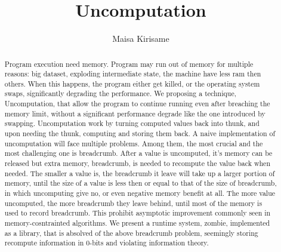 \documentclass[acmsmall]{acmart}
\begin{document}
	
	\title{Uncomputation}
	
	\author{Maisa Kirisame}
	\authornotemark[1]
	
	\renewcommand{\shortauthors}{Trovato et al.}
	
	\begin{abstract}
		Program execution need memory. Program may run out of memory for multiple reasons: big dataset, exploding intermediate state, the machine have less ram then others. When this happens, the program either get killed, or the operating system swaps, significantly degrading the performance.
		We proposing a technique, Uncomputation, that allow the program to continue running even after breaching the memory limit, without a significant performance degrade like the one introduced by swapping.
		Uncomputation work by turning computed values back into thunk, and upon needing the thunk, computing and storing them back.
		A naive implementation of uncomputation will face multiple problems. Among them, the most crucial and the most challenging one is breadcrumb. After a value is uncomputed, it's memory can be released but extra memory, breadcrumb, is needed to recompute the value back when needed.
		The smaller a value is, the breadcrumb it leave will take up a larger portion of memory, until the size of a value is less then or equal to that of the size of breadcrumb, in which uncomputing give no, or even negative memory benefit at all.
		The more value uncomputed, the more breadcrumb they leave behind, until most of the memory is used to record breadcrumb. This prohibit asymptotic improvement commonly seen in memory-cosntrainted algorithms.
		We present a runtime system, zombie, implemented as a library, that is absolved of the above breadcrumb problem, seemingly storing recompute information in 0-bits and violating information theory.
	\end{abstract}
	
\end{document}
